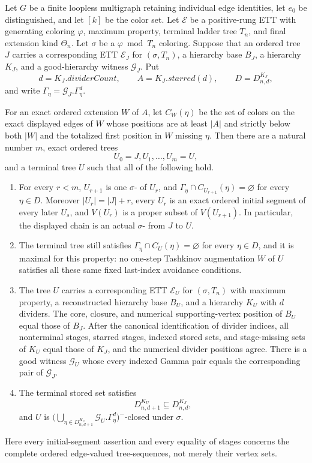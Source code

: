 \begin{lemma}
Let $G$ be a finite loopless multigraph retaining individual edge
identities, let $e_0$ be distinguished, and let $[k]$ be the color set.
Let $\mathcal E$ be a positive-rung ETT with generating coloring
$\varphi$, maximum property, terminal ladder tree $T_n$, and final
extension kind $\Theta_n$.  Let $\sigma$ be a $\varphi\bmod T_n$
coloring.  Suppose that an ordered tree $J$ carries a corresponding ETT
$\mathcal E_J$ for $(\sigma,T_n)$, a hierarchy base $B_J$, a hierarchy
$K_J$, and a good-hierarchy witness $\mathcal G_J$.  Put
\[
 d=K_J.\mathit{dividerCount},\qquad
 A=K_J.\mathit{starred}(d),\qquad D=D^{K_J}_{n,d},
\]
and write $\Gamma_\eta=\mathcal G_J.\Gamma^d_\eta$.

For an exact ordered extension $W$ of $A$, let $C_W(\eta)$ be the set of
colors on the exact displayed edges of $W$ whose positions are at least
$|A|$ and strictly below both $|W|$ and the totalized first position in
$W$ missing $\eta$.  Then there are a natural number $m$, exact ordered
trees
\[
                  U_0=J,U_1,\ldots,U_m=U,
\]
and a terminal tree $U$ such that all of the following hold.
\begin{enumerate}
\item For every $r<m$, $U_{r+1}$ is one
  $\sigma$- of $U_r$, and
  $\Gamma_\eta\cap C_{U_{r+1}}(\eta)=\varnothing$ for every $\eta\in D$.
  Moreover $|U_r|=|J|+r$, every $U_r$ is an exact ordered initial segment
  of every later $U_s$, and $V(U_r)$ is a proper subset of
  $V(U_{r+1})$.  In particular, the displayed chain is an actual
  $\sigma$- from $J$ to $U$.
\item The terminal tree still satisfies
  $\Gamma_\eta\cap C_U(\eta)=\varnothing$ for every $\eta\in D$, and it
  is maximal for this property: no one-step Tashkinov augmentation $W$ of
  $U$ satisfies all these same fixed last-index avoidance conditions.
\item The tree $U$ carries a corresponding ETT $\mathcal E_U$ for
  $(\sigma,T_n)$ with maximum property, a reconstructed hierarchy base
  $B_U$, and a hierarchy $K_U$ with $d$ dividers.  The core, closure, and
  numerical supporting-vertex position of $B_U$ equal those of $B_J$.
  After the canonical identification of divider indices, all nonterminal
  stages, starred stages, indexed stored sets, and stage-missing sets of
  $K_U$ equal those of $K_J$, and the numerical divider positions agree.
  There is a good witness $\mathcal G_U$ whose every indexed Gamma pair
  equals the corresponding pair of $\mathcal G_J$.
\item The terminal stored set satisfies
  \[
                  D^{K_U}_{n,d+1}\subseteq D^{K_J}_{n,d},
  \]
  and $U$ is
  $\bigl(\bigcup_{\eta\in D^{K_U}_{n,d+1}}
  \mathcal G_U.\Gamma^d_\eta\bigr)^-$-closed under $\sigma$.
\end{enumerate}
Here every initial-segment assertion and every equality of stages concerns
the complete ordered edge-valued tree-sequences, not merely their vertex
sets.
\end{lemma}
